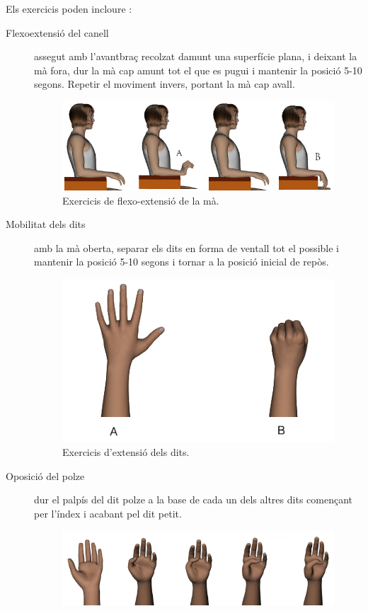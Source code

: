 \documentclass[12pt,a4paper,catalan]{article}
\begin{document}
	Els exercicis poden incloure \cite{hand-wrist-exercises}:
	\begin{description}
		\item[Flexoextensió del canell] assegut amb l'avantbraç recolzat damunt una superfície plana, i deixant la mà fora, dur la mà cap amunt tot el que es pugui i mantenir la posició 5-10 segons. Repetir el moviment invers, portant la mà cap avall.
		\begin{figure}[H]
			\includegraphics[width=\textwidth,keepaspectratio]{hand-extension-movements.png}
			\centering
			\caption{Exercicis de flexo-extensió de la mà.}
		\end{figure}
		\item[Mobilitat dels dits] amb la mà oberta, separar els dits en forma de ventall tot el possible i mantenir la posició 5-10 segons i tornar a la posició inicial de repòs.
		\begin{figure}[H]
			\includegraphics[width=\textwidth,keepaspectratio]{fingers-movility.jpg}
			\centering
			\caption{Exercicis d'extensió dels dits.}
		\end{figure}
		\item[Oposició del polze] dur el palpís del dit polze a la base de cada un dels altres dits començant per l'índex i acabant pel dit petit.
		\begin{figure}[H]
			\includegraphics[width=\textwidth,keepaspectratio]{thumb-movility.jpg}

\end{figure}
\end{description}
\end{document}
